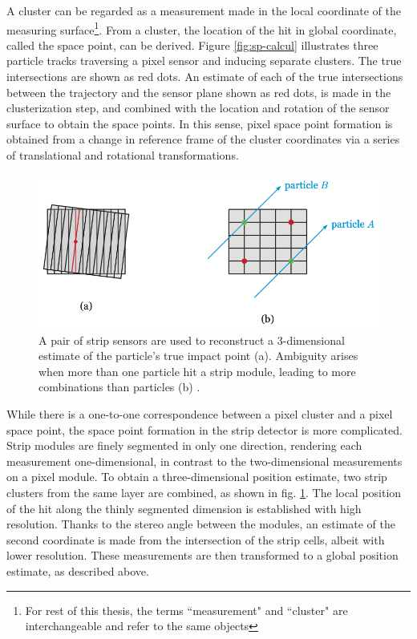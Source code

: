 A cluster can be regarded as a measurement made in the local coordinate of the measuring surface\footnote{For rest of this thesis, the terms ``measurement" and ``cluster" are interchangeable and refer to the same objects}.
From a cluster, the location of the hit in global coordinate, called the space point, can be derived.
Figure \ref{fig:sp-calcul} illustrates three particle tracks traversing a pixel sensor and inducing separate clusters. 
The true intersections are shown as red dots. 
An estimate of each of the true intersections between the trajectory and the sensor plane shown as red dots, is made in the clusterization step, and combined with the location and rotation of the sensor surface to obtain the space points.
In this sense, pixel space point formation is obtained from a change in reference frame of the cluster coordinates via a series of translational and rotational transformations. 

\begin{figure}[htb]
    \centering
    \includegraphics[width=0.8\linewidth]{figures/sp-calcul-strip.png}
    \caption{A pair of strip sensors are used to reconstruct a 3-dimensional estimate of the particle's true impact point (a). Ambiguity arises when more than one particle hit a strip module, leading to more combinations than particles (b) \cite{paul-thesis}. }
    \label{fig:sp-calcul-strip}
\end{figure}

While there is a one-to-one correspondence between a pixel cluster and a pixel space point, the space point formation in the strip detector is more complicated.
Strip modules are finely segmented in only one direction, rendering each measurement one-dimensional, in contrast to the two-dimensional measurements on a pixel module.
To obtain a three-dimensional position estimate, two strip clusters from the same layer are combined, as shown in fig. \ref{fig:sp-calcul-strip}. 
The local position of the hit along the thinly segmented dimension is established with high resolution.
Thanks to the stereo angle between the modules, an estimate of the second coordinate is made from the intersection of the strip cells, albeit with lower resolution. 
These measurements are then transformed to a global position estimate, as described above. 

